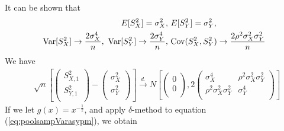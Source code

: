 	It can be shown that 
	\begin{equation}\label{eq:sampVarasypm}
	\begin{aligned}
	E[S_{X}^2] = \sigma_X^2,&~E[S_{Y}^2] = \sigma_Y^2,  \\
	\text{Var}[S_{X}^2] \rightarrow \frac{2\sigma_X^4}{n},~\text{Var}[S_{Y}^2] \rightarrow 
	\frac{2\sigma_Y^4}{n},&
	~\text{Cov}(S_{X}^2, S_{Y}^2) \rightarrow \frac{2\rho^2\sigma_X^2\sigma_Y^2}{n} \\
	\end{aligned}
	\end{equation} 
	We have 
	\begin{equation}\label{eq:poolsampVarasypm}
	\begin{aligned}
	& \sqrt{n}\left[\left( \begin{array}{c}
	S_{X, 1}^2\\
	S_{Y, 1}^2\\
	\end{array}\right)
	-
	\left( \begin{array}{c}
	\sigma_X^2\\
	\sigma_Y^2\\
	\end{array}\right)
	\right]
	\stackrel{d.}{\longrightarrow} 
	N\left[
	\left(\begin{array}{c}
	0\\
	0\\
	\end{array} \right), 
	2\left(
	\begin{array}{cc}
	\sigma_X^4 &\rho^2\sigma_X^2\sigma_Y^2 \\
	\rho^2\sigma_X^2\sigma_Y^2  &\sigma_Y^4 \\
	\end{array}
	\right)
	\right] 
	\end{aligned}
	\end{equation}
	If we let $g(x) = x^{-\frac{1}{2}}$, and apply $\delta$-method to equation 
	(\ref{eq:poolsampVarasypm}), we obtain

